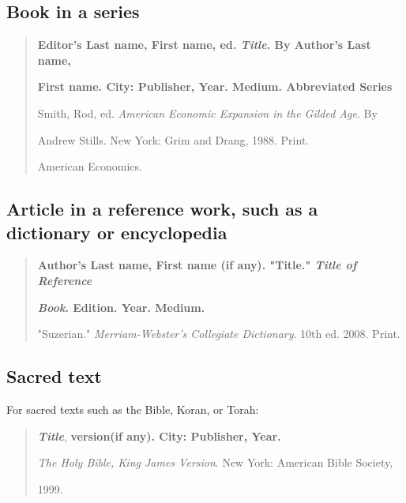 \subsection{Book in a series}

\begin{quote}

\textbf{Editor's Last name, First name, ed. \emph{Title}. By Author's Last name,}

\hspace{.4in}\textbf{First name. City: Publisher, Year. Medium. Abbreviated Series}

\medskip

Smith, Rod, ed. \emph{American Economic Expansion in the Gilded Age}. By

\hspace{.4in} Andrew Stills. New York: Grim and Drang, 1988. Print.

\hspace{.4in}American Economics.
\end{quote}

\subsection{Article in a reference work, such as a dictionary or encyclopedia}
\begin{quote}
\textbf{Author's Last name, First name (if any). "Title." \emph{Title of Reference}}

\hspace{.4in}\textbf{\emph{Book}. Edition. Year. Medium.}

\medskip

"Suzerian." \emph{Merriam-Webster's Collegiate Dictionary}. 10th ed. 2008. Print.

\end{quote}

\subsection{Sacred text}

For sacred texts such as the Bible, Koran, or Torah:

\begin{quote}
\emph{\textbf{Title}}, \textbf{version(if any). City: Publisher, Year.}
\medskip

\emph{The Holy Bible, King James Version}. New York: American Bible Society, 

\hspace{.4in}1999.

\end{quote}

